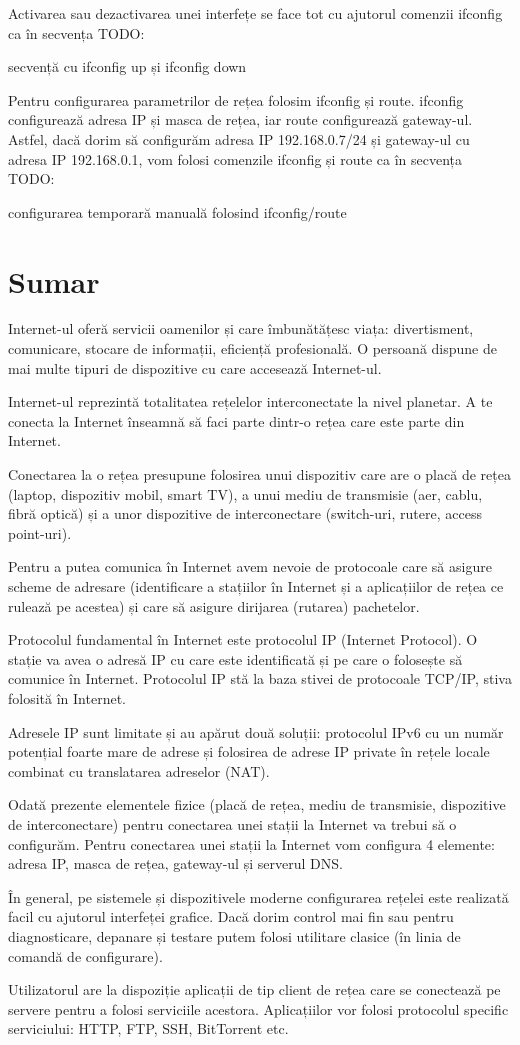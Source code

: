 Activarea sau dezactivarea unei interfețe se face tot cu ajutorul comenzii ifconfig ca în secvența TODO:

secvență cu ifconfig up și ifconfig down

Pentru configurarea parametrilor de rețea folosim ifconfig și route. ifconfig configurează adresa IP și masca de rețea, iar route configurează gateway-ul. Astfel, dacă dorim să configurăm adresa IP 192.168.0.7/24 și gateway-ul cu adresa IP 192.168.0.1, vom folosi comenzile ifconfig și route ca în secvența TODO:

configurarea temporară manuală folosind ifconfig/route

\section{Sumar}
\label{sec:net:summary}

Internet-ul oferă servicii oamenilor și care îmbunătățesc viața: divertisment, comunicare, stocare de informații, eficiență profesională. O persoană dispune de mai multe tipuri de dispozitive cu care accesează Internet-ul.

Internet-ul reprezintă totalitatea rețelelor interconectate la nivel planetar. A te conecta la Internet înseamnă să faci parte dintr-o rețea care este parte din Internet.

Conectarea la o rețea presupune folosirea unui dispozitiv care are o placă de rețea (laptop, dispozitiv mobil, smart TV), a unui mediu de transmisie (aer, cablu, fibră optică) și a unor dispozitive de interconectare (switch-uri, rutere, access point-uri).

Pentru a putea comunica în Internet avem nevoie de protocoale care să asigure scheme de adresare (identificare a stațiilor în Internet și a aplicațiilor de rețea ce rulează pe acestea) și care să asigure dirijarea (rutarea) pachetelor.

Protocolul fundamental în Internet este protocolul IP (Internet Protocol). O stație va avea o adresă IP cu care este identificată și pe care o folosește să comunice în Internet. Protocolul IP stă la baza stivei de protocoale TCP/IP, stiva folosită în Internet.

Adresele IP sunt limitate și au apărut două soluții: protocolul IPv6 cu un număr potențial foarte mare de adrese și folosirea de adrese IP private în rețele locale combinat cu translatarea adreselor (NAT).

Odată prezente elementele fizice (placă de rețea, mediu de transmisie, dispozitive de interconectare) pentru conectarea unei stații la Internet va trebui să o configurăm. Pentru conectarea unei stații la Internet vom configura 4 elemente: adresa IP, masca de rețea, gateway-ul și serverul DNS.

În general, pe sistemele și dispozitivele moderne configurarea rețelei este realizată facil cu ajutorul interfeței grafice. Dacă dorim control mai fin sau pentru diagnosticare, depanare și testare putem folosi utilitare clasice (în linia de comandă de configurare).

Utilizatorul are la dispoziție aplicații de tip client de rețea care se conectează pe servere pentru a folosi serviciile acestora. Aplicațiilor vor folosi protocolul specific serviciului: HTTP, FTP, SSH, BitTorrent etc.
